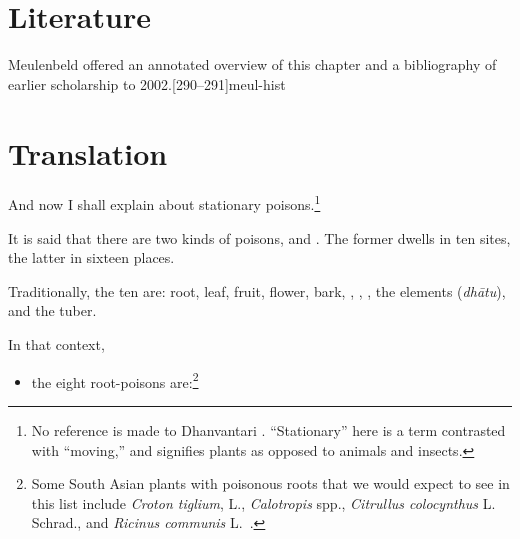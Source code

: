 
\section{Literature}

Meulenbeld offered an annotated overview of this chapter and a bibliography
of earlier scholarship to 2002.[290--291]{meul-hist} 

\section{Translation}

\begin{translation}
    
\item[1]

And now I shall explain 
about stationary poisons.\footnote{No reference is made to
    Dhanvantari \citep[see][]{birc-2021}. “Stationary” here is a term
    contrasted with “moving,” and signifies plants as opposed to animals
    and insects.}
  
    \item[3]
    \noindent It is said that there are two kinds of poisons,
     and . The former
    dwells in ten sites, the latter in sixteen places.
   
    \item[4]
    Traditionally, the ten are: root, leaf, fruit, flower, bark,
    , , , the
    elements (\emph{dhātu}), and the tuber.

    \item[5]
    
    In that context,\label{poisonousplants}
    \begin{itemize}
        \item the eight root-poisons are:\footnote{Some South Asian
    plants with poisonous roots that we would expect to see in
    this list include \emph{Croton tiglium}, L., \emph{Calotropis}
    spp., \emph{Citrullus colocynthus} L. Schrad., and
    \emph{Ricinus communis} L.\ \citep{pill-2010}.} %
        \begin{enumerate}
            

\end{enumerate}
\end{itemize}
\end{translation}
